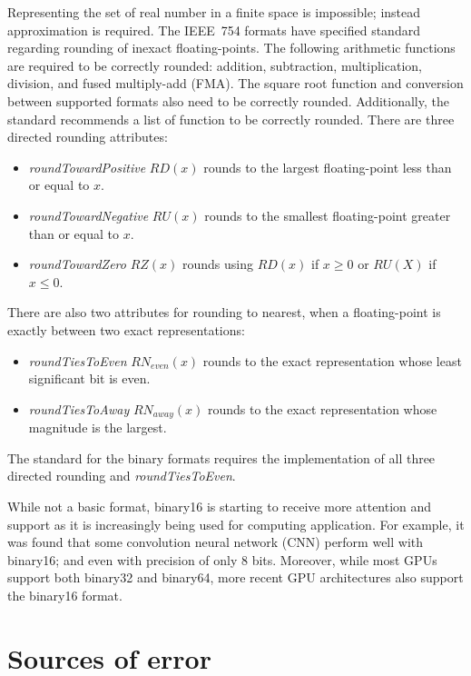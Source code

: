 Representing the set of real number in a finite space is impossible; instead approximation is required.
The IEEE~754 formats have specified standard regarding rounding of inexact floating-points.
The following arithmetic functions are required to be correctly rounded: addition, subtraction, multiplication, division, and fused multiply-add (FMA).
The square root function and conversion between supported formats also need to be correctly rounded.
Additionally, the standard recommends a list of function to be correctly rounded. %
There are three directed rounding attributes:
\begin{itemize}
	\item \textit{roundTowardPositive} $RD(x)$ rounds to the largest floating-point less than or equal to $x$.
	\item \textit{roundTowardNegative} $RU(x)$ rounds to the smallest floating-point greater than or equal to $x$.
	\item \textit{roundTowardZero} $RZ(x)$ rounds using $RD(x)$ if $x \ge 0$ or $RU(X)$ if $x \le 0$.
\end{itemize}
There are also two attributes for rounding to nearest, when a floating-point is exactly between two exact representations:
\begin{itemize}
	\item \textit{roundTiesToEven} $RN_{even}(x)$ rounds to the exact representation whose least significant bit is even.
	\item \textit{roundTiesToAway} $RN_{away}(x)$ rounds to the exact representation whose magnitude is the largest.
\end{itemize}
The standard for the binary formats requires the implementation of all three directed rounding and \textit{roundTiesToEven}.

While not a basic format, binary16 is starting to receive more attention and support as it is increasingly being used for computing application.
For example, it was found that some convolution neural network (CNN) perform well with binary16; and even with precision of only 8 bits.
Moreover, while most GPUs support both binary32 and binary64, more recent GPU architectures also support the binary16 format.

\section{Sources of error}
\begin{comment}
- rounding
- double rounding
- cancellation
- overflow & underflow
- accumulation
- swamping

\end{comment}
